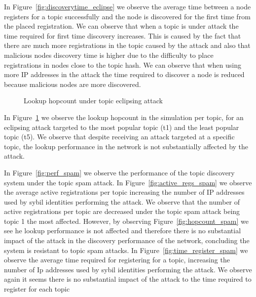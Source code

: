 In Figure~\ref{fig:discoverytime_eclipse} we observe the average time between a node registers for a topic successfully and the node is discovered for the first time from the placed registration.
We can observe that when a topic is under attack the time required for first time discovery increases. 
This is caused by the fact that there are much more registrations in the topic caused by the attack and also that malicious nodes discovery time is higher due to the difficulty to place registrations in nodes close to the topic hash.  
We can observe that when using more IP addresses in the attack the time required to discover a node is reduced because malicious nodes are more discovered.

\begin{figure}[!h]
\centering
{} 
\hspace{-0.16cm}
 \caption{Lookup hopcount under topic eclipsing attack} 
\label{fig:lookup_eclipse}
\vspace{-0.15in}
\end{figure}   


In Figure~\ref{fig:lookup_eclipse} we observe the lookup hopcount in the simulation per topic,  for an eclipsing attack targeted to the most popular topic (t1) and the least popular topic (t5).
We observe that despite receiving an attack targeted at a specific topic,  the lookup performance in the network is not substantially affected by the attack.

In Figure~\ref{fig:perf_spam} we observe the performance of the topic discovery system under  the topic spam attack.
In Figure~\ref{fig:active_regs_spam} we observe the average active registrations per topic increasing the number of IP addresses used by sybil identities performing the attack.  
We observe that the number of active registrations per topic are decreased under the topic spam attack being topic 1 the most affected.
However, by observing Figure~\ref{fig:hopcount_spam} we see he lookup performance is not affected and therefore there is no substantial impact of the attack in the discovery performance of the network, concluding the system is resistant to topic spam attacks.
In Figure~\ref{fig:time_register_spam} we observe the average time required for registering for a topic,  increasing the number of Ip addresses used by sybil identities performing the attack.  
We observe again it seems there is no substantial impact of the attack to the time required to register for each topic

